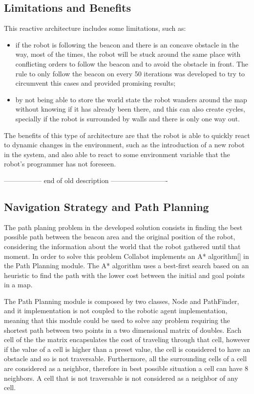 \documentclass[oribibl]{llncs}
\begin{document}
\subsection{Limitations and Benefits}
This reactive architecture includes some limitations, such as:

\begin{itemize}
  \item if the robot is following the beacon and there is an concave obstacle in the way, most of the times, the robot will be stuck around the same place with conflicting orders to follow the beacon and to avoid the obstacle in front. The rule to only follow the beacon on every 50 iterations was developed to try to circumvent this cases and provided promising results;
  \item by not being able to store the world state the robot wanders around the map without knowing if it has already been there, and this can also create cycles, specially if the robot is surrounded by walls and there is only one way out.
\end{itemize}

The benefits of this type of architecture are that the robot is able to quickly react to dynamic changes in the environment, such as the introduction of a new robot in the system, and also able to react to some environment variable that the robot's programmer has not foreseen.

----------------- end of old description -------------------------

\subsection{Navigation Strategy and Path Planning}

The path planing problem in the developed solution consists in finding the best possible path between the beacon area and the original position of the robot, considering the information about the world that the robot gathered until that moment. In order to solve this problem Collabot implements an A* algorithm[] in the Path Planning module. The A* algorithm uses a best-first search based on an heuristic to find the path with the lower cost between the initial and goal points in a map.

The Path Planning module is composed by two classes, Node and PathFinder, and it implementation is not coupled to the robotic agent implementation, meaning that this module could be used to solve any problem requiring the shortest path between two points in a two dimensional matrix of doubles. Each cell of the the matrix encapsulates the cost of traveling through that cell, however if the value of a cell is higher than a preset value, the cell is considered to have an obstacle and so is not traversable. Furthermore, all the surrounding cells of a cell are considered as a neighbor, therefore in best possible situation a cell can have 8 neighbors. A cell that is not traversable is not considered as a neighbor of any cell.
\end{document}
